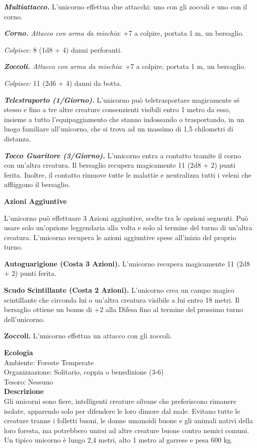 \begin{multicols}{2}
\emph{\textbf{Multiattacco.}} L'unicorno effettua due attacchi: uno con gli zoccoli e uno con il corno.

\emph{\textbf{Corno.} Attacco con arma da mischia}: +7 a colpire, portata 1 m, un bersaglio.

\emph{Colpisce:} 8 (1d8 + 4) danni perforanti.

\emph{\textbf{Zoccoli.} Attacco con arma da mischia}: +7 a colpire, portata 1 m, un bersaglio.

\emph{Colpisce:} 11 (2d6 + 4) danni da botta.

\emph{\textbf{Telestraporto (1/Giorno).}} L'unicorno può teletrasportare  magicamente sé stesso e fino a tre altre creature consenzienti  visibili entro 1 metro da esso, insieme a tutto  l'equipaggiamento che stanno indossando o trasportando, in un  luogo familiare all'unicorno, che si trova ad un massimo di 1,5 chilometri di distanza.

\emph{\textbf{Tocco Guaritore (3/Giorno).}} L'unicorno entra a contatto tramite il corno con un'altra creatura. Il bersaglio recupera magicamente 11 (2d8 + 2) punti ferita. Inoltre, il contatto rimuove tutte le malattie e neutralizza tutti i veleni che affliggono il bersaglio.

\textbf{Azioni Aggiuntive}

L'unicorno può effettuare 3 Azioni aggiuntive, scelte tra le opzioni seguenti. Può usare solo un'opzione leggendaria alla volta e solo al termine del turno di un'altra creatura. L'unicorno recupera le azioni aggiuntive spese all'inizio del proprio turno.

\textbf{Autoguarigione (Costa 3 Azioni).} L'unicorno recupera magicamente 11 (2d8 + 2) punti ferita.

\textbf{Scudo Scintillante (Costa 2 Azioni).} L'unicorno crea un campo magico scintillante che circonda lui o un'altra creatura visibile a lui entro 18 metri. Il bersaglio ottiene un bonus di +2 alla Difesa fino al termine del prossimo turno dell'unicorno.

\textbf{Zoccoli.} L'unicorno effettua un attacco con gli zoccoli.

\textbf{Ecologia}\\
Ambiente: Foreste Temperate\\
Organizzazione: Solitario, coppia o benedizione (3-6)\\
Tesoro: Nessuno\\
\textbf{Descrizione}\\
Gli unicorni sono fiere, intelligenti creature silvane che preferiscono rimanere isolate, apparendo solo per difendere le loro dimore dal male. Evitano tutte le creature tranne i folletti buoni, le donne umanoidi buone e gli animali nativi della loro foresta, ma potrebbero unirsi ad altre creature buone contro nemici comuni. Un tipico unicorno è lungo 2,4 metri, alto 1 metro al garrese e pesa 600 kg.\\


\end{multicols}
